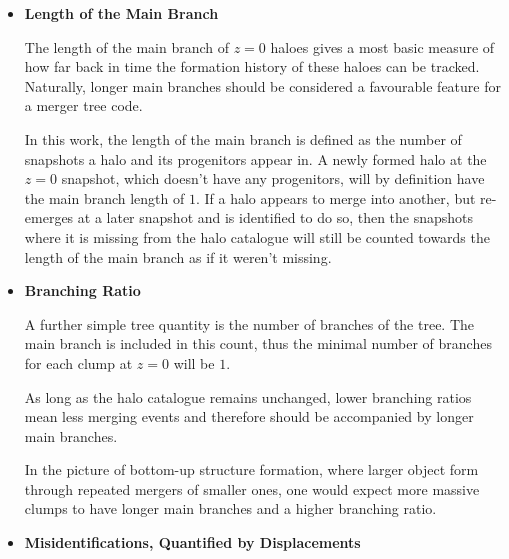 \begin{itemize}
	\item \textbf{Length of the Main Branch}
	
		The length of the main branch of $z=0$ haloes gives a most basic measure of how far back in time the formation history of these haloes can be tracked.
		Naturally, longer main branches should be considered a favourable feature for a merger tree code.
		
		In this work, the length of the main branch is defined as the number of snapshots a halo and its progenitors appear in.
		A newly formed halo at the $z=0$ snapshot, which doesn't have any progenitors, will by definition have the main branch length of $1$.
		If a halo appears to merge into another, but re-emerges at a later snapshot and is identified to do so, then the snapshots where it is missing from the halo catalogue will still be counted towards the length of the main branch as if it weren't missing. \\

	
	\item \textbf{Branching Ratio}
	
		A further simple tree quantity is the number of branches of the tree.
		The main branch is included in this count, thus the minimal number of branches for each clump at $z=0$ will be $1$.
	
		As long as the halo catalogue remains unchanged, lower branching ratios mean less merging events and therefore should be accompanied by longer main branches. 
		
		In the picture of bottom-up structure formation, where larger object form through repeated mergers of smaller ones, one would expect more massive clumps to have longer main branches and a higher branching ratio. \\
		
		
	
	\item \textbf{Misidentifications, Quantified by Displacements}
	

\end{itemize}
